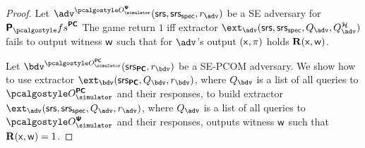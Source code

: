 \documentclass[runningheads,11pt]{llncs}
\begin{document}
\begin{proof}
   Let $\adv^{\oraclesps}(\srs, \srss, \radv)$ be a SE adversary
  for $\plonkprotfs^{\PCOM}$
  The game return $1$ iff extractor $\ext_\adv(\srs, \srss, \qadv,
  \qroadv{\adv})$ fails to output witness $\mathsf{w}$ such that for $\adv$'s output
  $(\mathsf{x}, \pi)$ holds $\mathbf{R}(\mathsf{x}, \mathsf{w})$.
  
   Let $\bdv^{\oraclespcom}(\srs_{\PCOM}, \rbdv)$ be a SE-PCOM
  adversary. We show how to use extractor
  $\ext_\bdv(\srs_{\PCOM}, \qbdv, \rbdv)$, where $\qbdv$ is a list of all
  queries to $\oraclespcom$ and their responses, to build extractor
  $\ext_\adv(\srs, \srss, \qadv, \radv)$, where $\qadv$ is a list of all queries
  to $\oraclesps$ and their responses, outputs witness $\mathsf{w}$ such that
  $\mathbf{R}(\mathsf{x}, \mathsf{w}) = 1$.


\end{proof}
\end{document}
